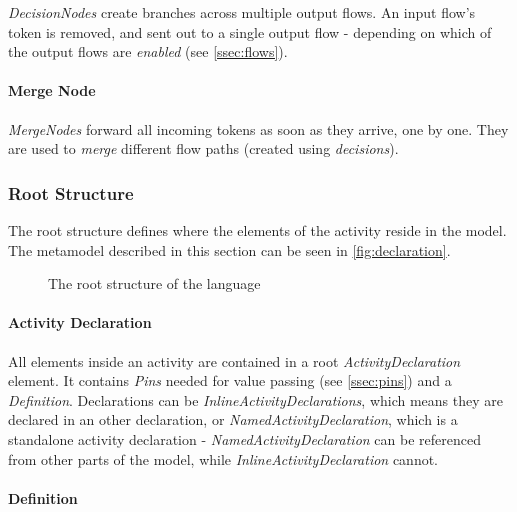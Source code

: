 \emph{DecisionNodes} create branches across multiple output flows. An input flow's token is removed, and sent out to a single output flow - depending on which of the output flows are \emph{enabled} (see \autoref{ssec:flows}).

\paragraph{Merge Node}

\emph{MergeNodes} forward all incoming tokens as soon as they arrive, one by one. They are used to \emph{merge} different flow paths (created using \emph{decisions}).

\subsubsection*{Root Structure}\label{ssec:root_structure}

The root structure defines where the elements of the activity reside in the model. The metamodel described in this section can be seen in \autoref{fig:declaration}.

\begin{figure}[!ht]
	\centering
	
	\caption{The root structure of the language}
	\label{fig:declaration}
\end{figure}

\paragraph{Activity Declaration}\label{par:activity_declaration}

All elements inside an activity are contained in a root \emph{ActivityDeclaration} element. It contains \emph{Pins} needed for value passing (see \autoref{ssec:pins}) and a \emph{Definition}. Declarations can be \emph{InlineActivityDeclarations}, which means they are declared in an other declaration, or \emph{NamedActivityDeclaration}, which is a standalone activity declaration - \emph{NamedActivityDeclaration} can be referenced from other parts of the model, while \emph{InlineActivityDeclaration} cannot.

\paragraph{Definition}\label{par:definition}

